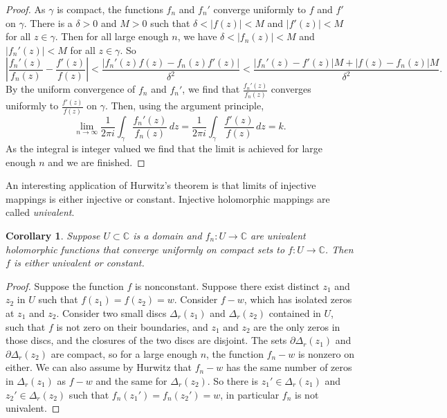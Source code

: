 \documentclass[12pt,openany]{book}
\newcommand{\sabs}[1]{\lvert {#1} \rvert}
\newcommand{\abs}[1]{\left\lvert {#1} \right\rvert}
\newcommand{\C}{{\mathbb{C}}}
\newcommand{\myindex}[1]{#1\index{#1}}
\theoremstyle{plain}
\newtheorem{cor}[thm]{Corollary}
\theoremstyle{remark}
\theoremstyle{definition}
\theoremstyle{exercise}
\theoremstyle{example}
\begin{document}
\begin{proof}
As $\gamma$ is compact, the functions $f_n$ and $f_n'$
converge uniformly to $f$ and $f'$ on $\gamma$.
There is a $\delta > 0$ and $M > 0$ such that $\delta < \sabs{f(z)} < M$
and $\sabs{f'(z)} < M$ for all $z \in \gamma$.
Then for all large enough $n$, we have
$\delta < \sabs{f_n(z)} < M$ and $\sabs{f_n'(z)} < M$ for all $z \in \gamma$.  So
\begin{equation*}
\abs{
\frac{f_n'(z)}{f_n(z)}-
\frac{f'(z)}{f(z)}
}
<
\frac{\abs{f_n'(z)f(z) - f_n(z)f'(z)}}{\delta^2}
<
\frac{\abs{f_n'(z)-f'(z)} M + \abs{f(z) - f_n(z)} M}{\delta^2} .
\end{equation*}
By the uniform convergence of $f_n$ and $f_n'$, we find that
$\frac{f_n'(z)}{f_n(z)}$ converges uniformly to
$\frac{f'(z)}{f(z)}$ on $\gamma$.  Then, using the argument principle,
\begin{equation*}
\lim_{n\to\infty} \frac{1}{2\pi i} \int_\gamma
\frac{f_n'(z)}{f_n(z)} \, dz
=
\frac{1}{2\pi i} \int_\gamma
\frac{f'(z)}{f(z)} \, dz
=
k .
\end{equation*}
As the integral is integer valued we find that the limit is achieved
for large enough $n$ and we are finished.
\end{proof}

An interesting application of Hurwitz's theorem is that limits of
injective mappings is either injective or constant.  Injective holomorphic
mappings are called \emph{\myindex{univalent}}.

\begin{cor} \label{cor:univalentlimit}
Suppose $U \subset \C$ is a domain and $f_n \colon U \to \C$ are
univalent holomorphic functions that converge uniformly on compact sets
to $f \colon U \to \C$.  Then $f$ is either univalent or constant.
\end{cor}

\begin{proof}
Suppose the function $f$ is nonconstant.
Suppose there exist distinct $z_1$ and $z_2$ in $U$ such that $f(z_1) =
f(z_2) = w$.  Consider $f-w$, which has isolated zeros at $z_1$ and $z_2$.
Consider two small discs $\Delta_r(z_1)$ and $\Delta_r(z_2)$ contained in
$U$, such that $f$ is not zero on their boundaries,
and $z_1$ and $z_2$ are the only zeros
in those discs, and the closures of the two discs are disjoint.
The sets $\partial \Delta_r(z_1)$ and 
$\partial \Delta_r(z_2)$ are compact, so
for a large enough $n$, the function $f_n-w$ is nonzero on either.
We can also assume by Hurwitz that $f_n-w$ has the same number of
zeros in $\Delta_r(z_1)$ as $f-w$ and the same for $\Delta_r(z_2)$.
So there is $z_1' \in \Delta_r(z_1)$ and
$z_2' \in \Delta_r(z_2)$ such that $f_n(z_1')=f_n(z_2')=w$, in particular
$f_n$ is not univalent.
\end{proof}
\end{document}
